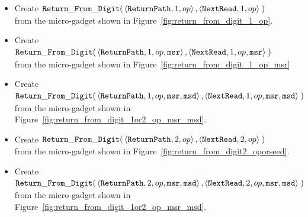\begin{itemize}

    \item Create
    $\begin{aligned}[t]
        {\tt Return\_From\_Digit}(& \left\langle {\tt ReturnPath}, 1, op \right\rangle,
                           \left\langle {\tt NextRead},        1, op \right\rangle \;)
    \end{aligned}$\\from the micro-gadget shown in Figure~\ref{fig:return_from_digit_1_op}.

    \item Create
    $\begin{aligned}[t]
        {\tt Return\_From\_Digit}(& \left\langle {\tt ReturnPath}, 1, op, {\tt msr} \right\rangle,
                           \left\langle {\tt NextRead},        1, op, {\tt msr} \right\rangle \;)
    \end{aligned}$\\from the micro-gadget shown in Figure~\ref{fig:return_from_digit_1_op_msr}

    \item Create
    $\begin{aligned}[t]
        {\tt Return\_From\_Digit}(& \left\langle {\tt ReturnPath}, 1, op, {\tt msr}, {\tt msd} \right\rangle,
                           \left\langle {\tt NextRead},        1, op, {\tt msr}, {\tt msd} \right\rangle \;)
    \end{aligned}$\\from the micro-gadget shown in Figure~\ref{fig:return_from_digit_1or2_op_msr_msd}.



    \item Create
    $\begin{aligned}[t]
        {\tt Return\_From\_Digit}(& \left\langle {\tt ReturnPath},    2, op \right\rangle,
                           \left\langle {\tt NextRead}, 2, op \right\rangle \;)
    \end{aligned}$\\from the micro-gadget shown in Figure~\ref{fig:return_from_digit2_oporseed}.

    \item Create
    $\begin{aligned}[t]
        {\tt Return\_From\_Digit}(& \left\langle {\tt ReturnPath},    2, op, {\tt msr}, {\tt msd} \right\rangle,
                           \left\langle {\tt NextRead}, 2, op, {\tt msr}, {\tt msd} \right\rangle \;)
    \end{aligned}$\\from the micro-gadget shown in Figure~\ref{fig:return_from_digit_1or2_op_msr_msd}.



\end{itemize}
